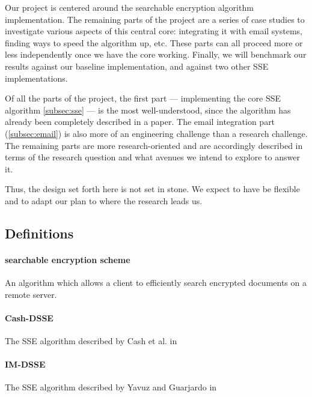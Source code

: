 Our project is centered around the searchable encryption algorithm implementation.
The remaining parts of the project are a series of case studies to investigate various aspects of this central core:
integrating it with email systems,
finding ways to speed the algorithm up, etc. 
These parts can all proceed more or less independently once we have the core working.
Finally, we will benchmark our results against our baseline implementation, and against two other SSE implementations.


Of all the parts of the project, the first part --- implementing the core SSE algorithm \ref{subsec:sse} --- is the most well-understood, since the algorithm has already been completely described in a paper.
The email integration part (\ref{subsec:email}) is also more of an engineering challenge than a research challenge. 
The remaining parts are more research-oriented and are accordingly described in terms of the research question and what avenues we intend to explore to answer it.

Thus, the design set forth here is not set in stone.
We expect to have be flexible and to adapt our plan to where the research leads us. 



\subsection{ Definitions }

\paragraph*{\textbf{searchable encryption scheme}} An algorithm which allows a client to efficiently search encrypted documents on a remote server.

\paragraph*{\textbf{Cash-DSSE}} The SSE algorithm described by Cash et al. in \cite{cash14}

\paragraph*{\textbf{IM-DSSE}} The SSE algorithm described by Yavuz and Guarjardo in \cite{yavuz15}




